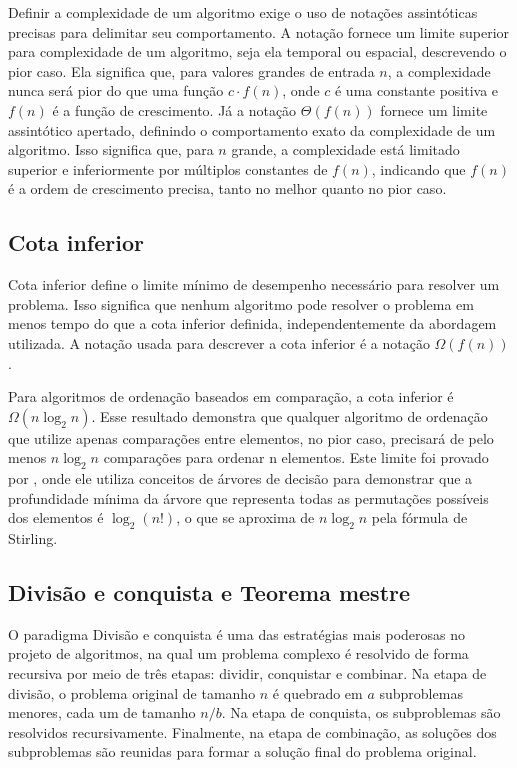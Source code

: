 Definir a complexidade de um algoritmo exige o uso de notações assintóticas precisas para delimitar seu comportamento. A notação  fornece um limite superior para complexidade de um algoritmo, seja ela temporal ou espacial, descrevendo o pior caso. Ela significa que, para valores grandes de entrada $n$, a complexidade nunca será pior do que uma função $c \cdot f(n)$, onde $c$ é uma constante positiva e $f(n)$ é a função de crescimento. Já a notação $\Theta(f(n))$ fornece um limite assintótico apertado, definindo o comportamento exato da complexidade de um algoritmo. Isso significa que, para $n$ grande, a complexidade está limitado superior e inferiormente por múltiplos constantes de $f(n)$, indicando que $f(n)$ é a ordem de crescimento precisa, tanto no melhor quanto no pior caso.

\subsection{Cota inferior}\label{subsec:cota-inferior}
Cota inferior define o limite mínimo de desempenho necessário para resolver um problema. Isso significa que nenhum algoritmo pode resolver o problema em menos tempo do que a cota inferior definida, independentemente da abordagem utilizada. A notação usada para descrever a cota inferior é a notação $\Omega(f(n))$.

Para algoritmos de ordenação baseados em comparação, a cota inferior é $\Omega(n\log_2n)$. Esse resultado demonstra que qualquer algoritmo de ordenação que utilize apenas comparações entre elementos, no pior caso, precisará de pelo menos $n\log_2n$ comparações para ordenar n elementos. Este limite foi provado por \cite{knuth1998art}, onde ele utiliza conceitos de árvores de decisão para demonstrar que a profundidade mínima da árvore que representa todas as permutações possíveis dos elementos é $\log_2(n!)$, o que se aproxima de $n\log_2n$ pela fórmula de Stirling.

\subsection{Divisão e conquista e Teorema mestre}
O paradigma Divisão e conquista é uma das estratégias mais poderosas no projeto de algoritmos, na qual um problema complexo é resolvido de forma recursiva por meio de três etapas: dividir, conquistar e combinar. Na etapa de divisão, o problema original de tamanho $n$ é quebrado em $a$ subproblemas menores, cada um de tamanho $n/b$. Na etapa de conquista, os subproblemas são resolvidos recursivamente. Finalmente, na etapa de combinação, as soluções dos subproblemas são reunidas para formar a solução final do problema original.

